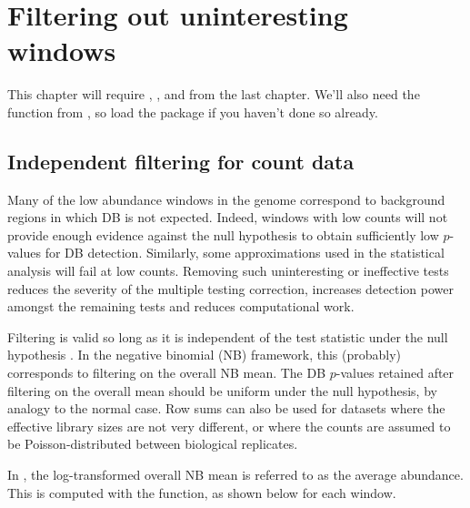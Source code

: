 \documentclass{report}\usepackage[]{graphicx}\usepackage[usenames,dvipsnames]{color}
\newenvironment{combox}
{ \definecolor{shadecolor}{RGB}{255, 240, 240} \begin{shaded}\begin{center}\begin{minipage}[t]{0.95\textwidth} }
{ \end{minipage}\end{center}\end{shaded} \definecolor{shadecolor}{RGB}{240,240,240} }
\begin{document}

\chapter{Filtering out uninteresting windows}
\label{chap:filter}

\begin{combox}
This chapter will require , ,  and  from the last chapter.
We'll also need the  function from , so load the package if you haven't done so already.
\end{combox}

\section{Independent filtering for count data}
Many of the low abundance windows in the genome correspond to background regions in which DB is not expected. 
Indeed, windows with low counts will not provide enough evidence against the null hypothesis to obtain sufficiently low $p$-values for DB detection. 
Similarly, some approximations used in the statistical analysis will fail at low counts. 
Removing such uninteresting or ineffective tests reduces the severity of the multiple testing correction, increases detection power amongst the remaining tests and reduces computational work.

Filtering is valid so long as it is independent of the test statistic under the null hypothesis \cite{bourgon2010}. 
In the negative binomial (NB) framework, this (probably) corresponds to filtering on the overall NB mean. 
The DB $p$-values retained after filtering on the overall mean should be uniform under the null hypothesis, by analogy to the normal case. 
Row sums can also be used for datasets where the effective library sizes are not very different, or where the counts are assumed to be Poisson-distributed between biological replicates. 

In , the log-transformed overall NB mean is referred to as the average abundance.
This is computed with the  function, as shown below for each window.
\end{document}
